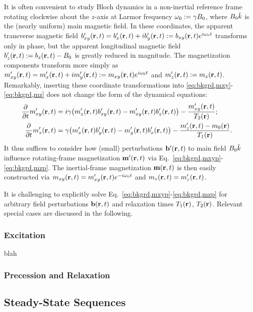 It is often convenient 
to study Bloch dynamics in a non-inertial reference frame
rotating clockwise about the $z$-axis 
at Larmor frequency 
$\omega_0 := \gamma B_0$,
where 
$B_0 \hat{k}$
is the (nearly uniform) main magnetic field.
In these coordinates,
the apparent transverse magnetic field 
$\bxyp\prt = \bxp\prt + i\byp\prt := \bxy\prt e^{i\omzero t}$
transforms only in phase,
but the apparent longitudinal magnetic field
$\bzp\prt := \bz\prt - \Bzero$
is greatly reduced in magnitude.
The magnetization components transform more simply as
$\mxyp\prt = \mxp\prt + i\myp\prt := \mxy\prt e^{i\omzero t}$
and 
$\mzp\prt := \mz\prt$.
Remarkably, inserting these coordinate transformations 
into \eqref{eq:bkgrd,mxy}-\eqref{eq:bkgrd,mz} 
does not change the form
of the dynamical equations:
\begin{align}
	\dela{t} \mxyp\prt &= i\gam\paren{\mzp\prt \bxyp\prt - \mxyp\prt \bzp\prt} -
		\frac{\mxyp\prt}{\Tt\pr} ;
		\label{eq:bkgrd,mxyp} \\
	\dela{t} \mzp\prt &= \gam\paren{\mxp\prt \byp\prt - \myp\prt \bxp\prt} - 
		\frac{\mzp\prt - \mzero\pr}{\To\pr}.
		\label{eq:bkgrd,mzp}
\end{align}
It thus suffices to consider 
how (small) perturbations $\bmbp\prt$
to main field $B_0 \hat{k}$ 
influence rotating-frame magnetization $\bmmp\prt$
via Eq.~\eqref{eq:bkgrd,mxyp}-\eqref{eq:bkgrd,mzp}.
The inertial-frame magnetization $\bmm\prt$ 
is then easily constructed via
$\mxy\prt = \mxyp\prt e^{-i\omzero t}$ 
and $\mz\prt = \mzp\prt$.

It is challenging
to explicitly solve Eq.~\eqref{eq:bkgrd,mxyp}-\eqref{eq:bkgrd,mzp}
for arbitrary field perturbations $\bmb\prt$
and relaxation times $\To\pr$, $\Tt\pr$. 
Relevant special cases are discussed in the following.

\subsubsection{Excitation}
\label{sss,bkgrd,mri,bloch,ex}

blah

\subsubsection{Precession and Relaxation}
\label{sss,bkgrd,mri,bloch,pr}

\subsection{Steady-State Sequences}
\label{ss,bkgrd,mri,ss}

